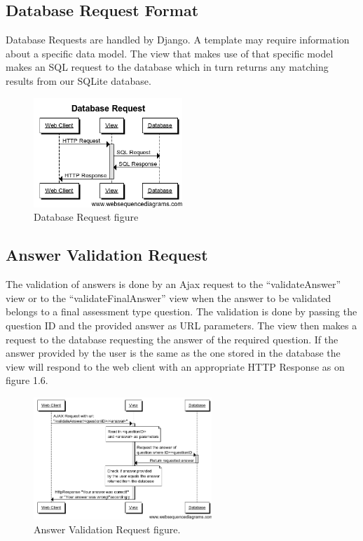 \documentclass{l3proj}
\begin{document}
{\subsection{Database Request Format}
Database Requests are handled by Django. A template may require
information about a specific data model. The view that makes use of
that specific model makes an SQL request to the database which in turn returns any matching results from our SQLite database.
\begin{figure}[h!]
   \caption{Database Request figure}
   \centering
     \includegraphics[width=0.5\textwidth]{images/databaseMessagePassing.png}
\end{figure}

\subsection{Answer Validation Request}
The validation of answers is done by an Ajax request to  the “validateAnswer” view or to the “validateFinalAnswer” view when the answer to be validated belongs to a final assessment type question. The validation is done by passing the question ID and the provided answer as URL parameters. The view  then makes a request to the database requesting the answer of the required question. If the answer provided by the user is the same as the one stored in the database the view will respond to the web client with an appropriate HTTP Response as on figure 1.6.
\begin{figure}[h!]
   \caption{Answer Validation Request figure.}
   \centering
     \includegraphics[width=0.6\textwidth]{images/validateAnswerRequest.png}
\end{figure} 

}
\end{document}
